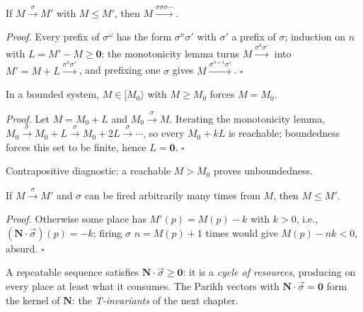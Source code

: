 \begin{corollary}
If $M \xrightarrow{\sigma} M'$ with $M \le M'$, then $M \xrightarrow{\sigma\sigma\sigma\cdots}$.
\end{corollary}

\textit{Proof.} Every prefix of $\sigma^\omega$ has the form $\sigma^n \sigma'$ with $\sigma'$ a prefix of $\sigma$; induction on $n$ with $L = M' - M \geq \mathbf{0}$: the monotonicity lemma turns $M \xrightarrow{\sigma^n \sigma'}$ into $M' = M + L \xrightarrow{\sigma^n \sigma'}$, and prefixing one $\sigma$ gives $M \xrightarrow{\sigma^{n+1} \sigma'}$. \hfill$\square$

\begin{lemma}[Boundedness]
In a bounded system, $M \in [M_0\rangle$ with $M \ge M_0$ forces $M = M_0$.
\end{lemma}

\textit{Proof.} Let $M = M_0 + L$ and $M_0 \xrightarrow{\sigma} M$. Iterating the monotonicity lemma, $M_0 \xrightarrow{\sigma} M_0 + L \xrightarrow{\sigma} M_0 + 2L \xrightarrow{\sigma} \cdots$, so every $M_0 + kL$ is reachable; boundedness forces this set to be finite, hence $L = \mathbf{0}$. \hfill$\square$

Contrapositive diagnostic: a reachable $M > M_0$ proves unboundedness.

\begin{lemma}[Repetition]
If $M \xrightarrow{\sigma} M'$ and $\sigma$ can be fired arbitrarily many times from $M$, then $M \le M'$.
\end{lemma}

\textit{Proof.} Otherwise some place has $M'(p) = M(p) - k$ with $k > 0$, i.e., $(\mathbf{N} \cdot \vec{\sigma})(p) = -k$; firing $\sigma$ $n = M(p) + 1$ times would give $M(p) - nk < 0$, absurd. \hfill$\square$

A repeatable sequence satisfies $\mathbf{N} \cdot \vec{\sigma} \geq \mathbf{0}$: it is a \emph{cycle of resources}, producing on every place at least what it consumes. The Parikh vectors with $\mathbf{N} \cdot \vec{\sigma} = \mathbf{0}$ form the kernel of $\mathbf{N}$: the \emph{T-invariants} of the next chapter.

